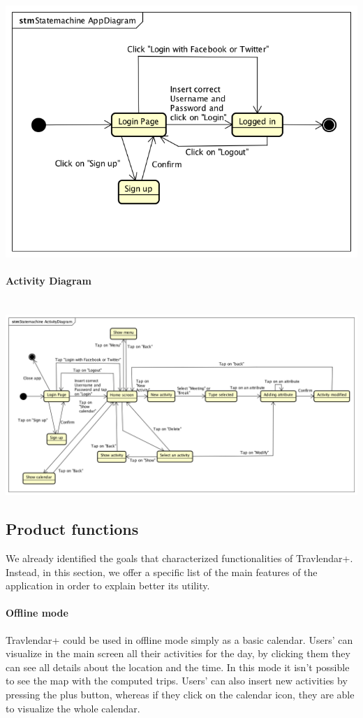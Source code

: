 \documentclass[12pt,titlepage]{article}
\begin{document}
\includegraphics[scale=0.47]{"Statemachine1"} 
\paragraph{Activity Diagram} \mbox{}\\ 
 
\includegraphics[scale=0.40]{"Statemachine2"} 
\pagebreak 
\subsection{Product functions}\label{sec:mod1}
We already identified the goals that characterized functionalities of Travlendar+. Instead, in this section, we offer a specific list of the main features of the application in order to explain better its utility. 

\paragraph{Offline mode}
Travlendar+ could be used in offline mode simply as a basic calendar. Users' can visualize in the main screen all their activities for the day, by clicking them they can see all details about the location and the time. In this mode it isn't possible to see the map with the computed trips. Users' can also insert new activities by pressing the plus button, whereas if they click on the calendar icon, they are able to visualize the whole calendar. 
\end{document}
